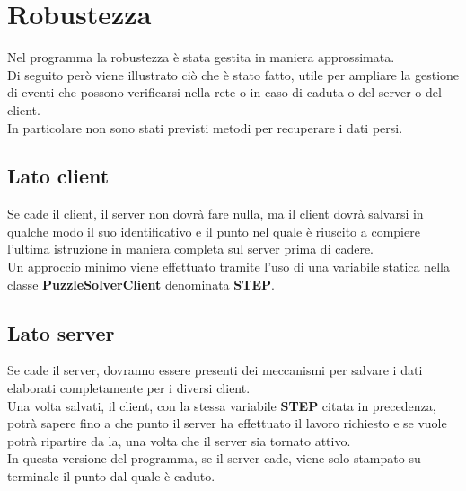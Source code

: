 % 
%
%

\section{Robustezza}
Nel programma la robustezza è stata gestita in maniera approssimata. \\
Di seguito però viene illustrato ciò che è stato fatto, utile per ampliare la gestione di eventi che possono verificarsi nella rete o in caso di caduta o del server o del client. \\
In particolare non sono stati previsti metodi per recuperare i dati persi.
	\subsection{Lato client} %
	\label{sub:lato_client}
	Se cade il client, il server non dovrà fare nulla, ma il client dovrà salvarsi in qualche modo il suo identificativo e il punto nel quale è riuscito a compiere l'ultima istruzione in maniera completa sul server prima di cadere. \\
	Un approccio minimo viene effettuato tramite l'uso di una variabile statica nella classe \textbf{PuzzleSolverClient} denominata \textbf{STEP}.
	
	\subsection{Lato server} %
	\label{sub:lato_server}
	Se cade il server, dovranno essere presenti dei meccanismi per salvare i dati elaborati completamente per i diversi client. \\
	Una volta salvati, il client, con la stessa variabile \textbf{STEP} citata in precedenza, potrà sapere fino a che punto il server ha effettuato il lavoro richiesto e se vuole potrà ripartire da la, una volta che il server sia tornato attivo. \\
	In questa versione del programma, se il server cade, viene solo stampato su terminale il punto dal quale è caduto.

